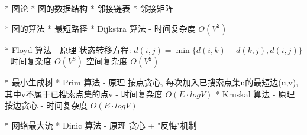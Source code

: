 * 图论
	* 图的数据结构
		* 邻接链表
		* 邻接矩阵

	* 图的算法
		* 最短路径
			* Dijkstra 算法
				\Algorithm
					- 时间复杂度 $O(V^2)$

			* Floyd 算法
				\Algorithm
					- 原理
						状态转移方程:
						$d(i,j) = \min\{ d(i,k) + d(k,j) , d(i,j) \}$
					- 时间复杂度 $O(V^3)$
					  空间复杂度 $O(V^2)$

		* 最小生成树
			* Prim 算法
				\Algorithm
					- 原理	
						按点贪心, 每次加入已搜索点集u的最短边(u,v), 其中v不属于已搜索点集的点v
					- 时间复杂度 $O(E·logV)$
			* Kruskal 算法
				\Algorithm
					- 原理
						按边贪心
					- 时间复杂度 $O(E·logV)$
					
		* 网络最大流
			* Dinic 算法
				\Algorithm
					- 原理
						贪心 + "反悔"机制